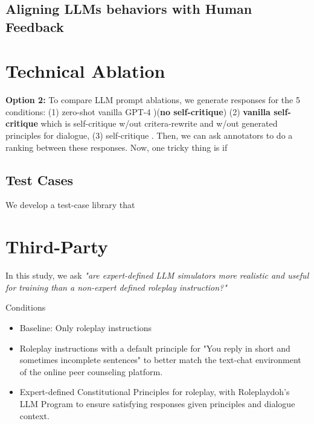 \subsection{Aligning LLMs behaviors with Human Feedback}





\section{Technical Ablation}


\textbf{Option 2: } To compare LLM prompt ablations, we generate responses for the 5 conditions: (1) zero-shot vanilla GPT-4 )(\textbf{no self-critique}) (2) \textbf{vanilla self-critique} which is self-critique w/out critera-rewrite and w/out generated principles for dialogue, (3) self-critique .  Then, we can ask annotators to do a ranking between these responses.  
Now, one tricky thing is if 

\subsection{Test Cases}
We develop a test-case library that 


\section{Third-Party}


In this study, we ask \textit{"are expert-defined LLM simulators more realistic and useful for training than a non-expert defined roleplay instruction?"}

Conditions
\begin{itemize}
    \item Baseline: Only roleplay instructions 
    \item {} Roleplay instructions with a default principle for "You reply in short and sometimes incomplete sentences" to better match the text-chat environment of the online peer counseling platform.
    \item Expert-defined Constitutional Principles for roleplay, with Roleplaydoh's LLM Program to ensure satisfying responses given principles and dialogue context.
\end{itemize}

